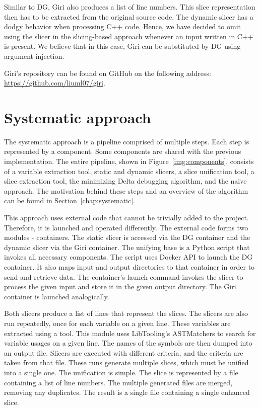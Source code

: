 Similar to DG, Giri also produces a list of line numbers. 
This slice representation then has to be extracted from the original source 
code.
The dynamic slicer has a dodgy behavior when processing C++ code. 
Hence, we have decided to omit using the slicer in the slicing-based approach 
whenever an input written in C++ is present. 
We believe that in this case, Giri can be substituted by DG using argument 
injection.

Giri's repository can be found on GitHub on the following address: 
\url{https://github.com/liuml07/giri}.

\section{Systematic approach}

The systematic approach is a pipeline comprised of multiple steps. 
Each step is represented by a component. 
Some components are shared with the previous implementation. 
The entire pipeline, shown in Figure~\ref{img:components}, consists of 
a variable extraction tool, static and dynamic slicers, a slice unification 
tool, a slice extraction tool, the minimizing Delta debugging algorithm, 
and the naive approach. 
The motivation behind these steps and an overview of the algorithm can be 
found in Section~\ref{chap:systematic}.

This approach uses external code that cannot be trivially added to 
the project.
Therefore, it is launched and operated differently.
The external code forms two modules - containers. 
The static slicer is accessed via the DG container and the dynamic slicer 
via the Giri container. 
The unifying base is a Python script that invokes all necessary components.
The script uses Docker API to launch the DG container.
It also maps input and output directories to that container in order to send 
and retrieve data.
The container's launch command invokes the slicer to process the given input 
and store it in the given output directory.
The Giri container is launched analogically.

Both slicers produce a list of lines that represent the slices. 
The slicers are also run repeatedly, once for each variable on a given line. 
These variables are extracted using a  tool. 
This module uses LibTooling's ASTMatchers to search for variable usages on 
a given line. 
The names of the symbols are then dumped into an output file. 
Slicers are executed with different criteria, and the criteria are taken 
from that file.
These runs generate multiple slices, which must be unified into a single one. 
The unification is simple. 
The slice is represented by a file containing a list of line numbers. 
The multiple generated files are merged, removing any duplicates. 
The result is a single file containing a single enhanced slice. 

